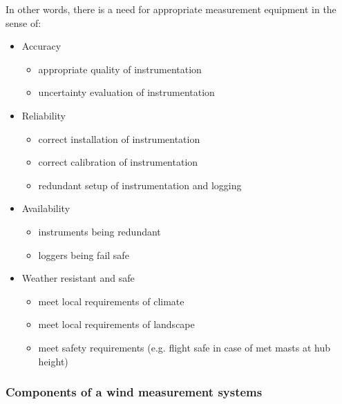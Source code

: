 In other words, there is a need for appropriate measurement equipment in the sense of: 
\begin{itemize}
    \item Accuracy 
        \begin{itemize}
            \vspace{-0.2cm}\item appropriate quality of instrumentation
           \vspace{-0.2cm} \item uncertainty evaluation of instrumentation
        \end{itemize}
    \item Reliability
        \begin{itemize}
            \vspace{-0.2cm}\item correct installation of instrumentation
           \vspace{-0.2cm} \item correct calibration of instrumentation
            \vspace{-0.2cm}\item redundant setup of instrumentation and logging
        \end{itemize}
    \item Availability
        \begin{itemize}
            \vspace{-0.2cm}\item instruments being redundant
            \vspace{-0.2cm}\item loggers being fail safe
        \end{itemize}
    \item Weather resistant and safe
        \begin{itemize}
            \vspace{-0.2cm}\item meet local requirements of climate
            \vspace{-0.2cm}\item meet local requirements of landscape
            \vspace{-0.2cm}\item meet safety requirements (e.g. flight safe in case of met masts at hub height)
        \end{itemize} 
\end{itemize}


\subsubsection{Components of a wind measurement systems {}}

